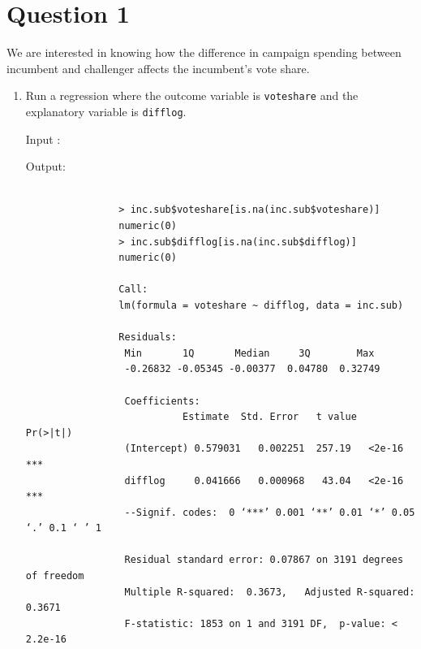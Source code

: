 \documentclass[12pt,letterpaper]{article}
\begin{document}
\section*{Question 1}
\vspace{.25cm}
\noindent We are interested in knowing how the difference in campaign spending between incumbent and challenger affects the incumbent's vote share. 
	\begin{enumerate}
		\item Run a regression where the outcome variable is \texttt{voteshare} and the explanatory variable is \texttt{difflog}.	
		
		\noindent Input :
			  
		
		
		Output:
			\begin{verbatim}
				
				> inc.sub$voteshare[is.na(inc.sub$voteshare)]
				numeric(0)
				> inc.sub$difflog[is.na(inc.sub$difflog)]
				numeric(0)
				
				Call:
				lm(formula = voteshare ~ difflog, data = inc.sub)
				
				Residuals:    
				 Min       1Q       Median     3Q        Max 
				 -0.26832 -0.05345 -0.00377  0.04780  0.32749
				 
				 Coefficients:            
				           Estimate  Std. Error   t value   Pr(>|t|)    
				 (Intercept) 0.579031   0.002251  257.19   <2e-16 ***
				 difflog     0.041666   0.000968   43.04   <2e-16 ***
				 --Signif. codes:  0 ‘***’ 0.001 ‘**’ 0.01 ‘*’ 0.05 ‘.’ 0.1 ‘ ’ 1
				 
				 Residual standard error: 0.07867 on 3191 degrees of freedom
				 Multiple R-squared:  0.3673,	Adjusted R-squared:  0.3671  
				 F-statistic: 1853 on 1 and 3191 DF,  p-value: < 2.2e-16
				
				\end{verbatim}
			\normalsize
			

\end{enumerate}
\end{document}
